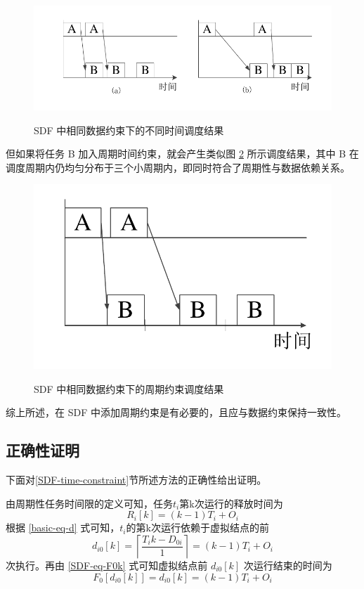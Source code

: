 \begin{figure}[!hbt]
  \centering
  \includegraphics[height=18ex]{figure/SDF-consistent-constraint.pdf}\\
  \caption{SDF 中相同数据约束下的不同时间调度结果}\label{SDF-fig-consistent-constraint}
\end{figure}

但如果将任务 B 加入周期时间约束，就会产生类似图 \ref{SDF-fig-consistent-constraint-2} 所示调度结果，其中 B 在调度周期内仍均匀分布于三个小周期内，即同时符合了周期性与数据依赖关系。

\begin{figure}[!hbt]
  \centering
  \includegraphics[height=15ex]{figure/SDF-consistent-constraint-2.pdf}\\
  \caption{SDF 中相同数据约束下的周期约束调度结果}\label{SDF-fig-consistent-constraint-2}
\end{figure}

综上所述，在 SDF 中添加周期约束是有必要的，且应与数据约束保持一致性。

\subsection{正确性证明}

下面对\ref{SDF-time-constraint}节所述方法的正确性给出证明。

由周期性任务时间限的定义可知，任务$t_i$第k次运行的释放时间为
\begin{equation}\label{SDF-eq-Rik}
  R_i[k]=(k-1)T_i+O_i
\end{equation}
根据 \eqref{basic-eq-d} 式可知，$t_i$的第k次运行依赖于虚拟结点的前
\begin{equation}\label{SDF-eq-di0k}
  d_{i0}[k]=\left\lceil\frac{T_ik-D_{0i}}{1}\right\rceil=(k-1)T_i+O_i
\end{equation}
次执行。再由 \eqref{SDF-eq-F0k} 式可知虚拟结点前 $d_{i0}[k]$ 次运行结束的时间为
\begin{equation}\label{SDF-eq-F0di0k}
  F_0[d_{i0}[k]]=d_{i0}[k]=(k-1)T_i+O_i
\end{equation}

